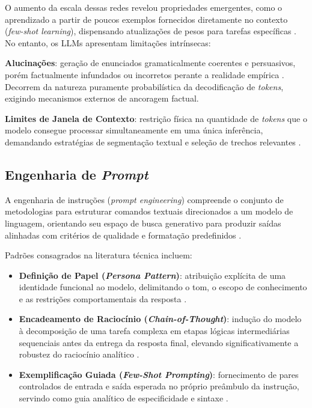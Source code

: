 \documentclass[12pt, a4paper]{article}
\begin{document}
  O aumento da escala dessas redes revelou propriedades emergentes, como o aprendizado a partir de poucos exemplos fornecidos diretamente no contexto (\textit{few-shot learning}), dispensando atualizações de pesos para tarefas específicas \cite{brown2020}. No entanto, os LLMs apresentam limitações intrínsecas:

  \textbf{Alucinações}: geração de enunciados gramaticalmente coerentes e persuasivos, porém factualmente infundados ou incorretos perante a realidade empírica \cite{ji2022}. Decorrem da natureza puramente probabilística da decodificação de \textit{tokens}, exigindo mecanismos externos de ancoragem factual.

  \textbf{Limites de Janela de Contexto}: restrição física na quantidade de \textit{tokens} que o modelo consegue processar simultaneamente em uma única inferência, demandando estratégias de segmentação textual e seleção de trechos relevantes \cite{zhao2023}.

  \subsection{Engenharia de \textit{Prompt}}
  \label{sec:prompt}

  A engenharia de instruções (\textit{prompt engineering}) compreende o conjunto de metodologias para estruturar comandos textuais direcionados a um modelo de linguagem, orientando seu espaço de busca generativo para produzir saídas alinhadas com critérios de qualidade e formatação predefinidos \cite{white2023}.

  Padrões consagrados na literatura técnica incluem:
  \begin{itemize}
    \item \textbf{Definição de Papel (\textit{Persona Pattern})}: atribuição explícita de uma identidade funcional ao modelo, delimitando o tom, o escopo de conhecimento e as restrições comportamentais da resposta \cite{white2023}.
    \item \textbf{Encadeamento de Raciocínio (\textit{Chain-of-Thought})}: indução do modelo à decomposição de uma tarefa complexa em etapas lógicas intermediárias sequenciais antes da entrega da resposta final, elevando significativamente a robustez do raciocínio analítico \cite{wei2022}.
    \item \textbf{Exemplificação Guiada (\textit{Few-Shot Prompting})}: fornecimento de pares controlados de entrada e saída esperada no próprio preâmbulo da instrução, servindo como guia analítico de especificidade e sintaxe \cite{brown2020}.
  \end{itemize}
\end{document}
